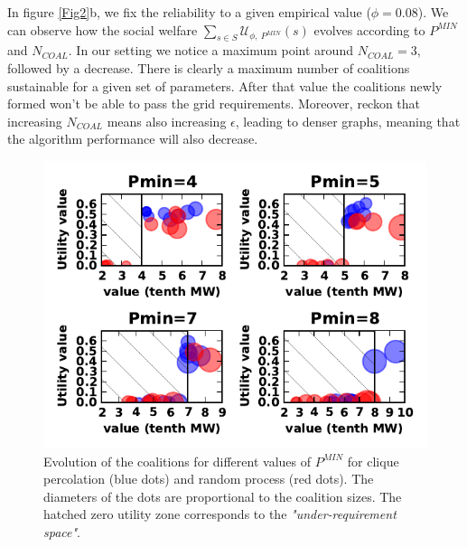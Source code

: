 \documentclass[conference]{IEEEtran}
\begin{document}
In figure \ref{Fig2}b, we fix the reliability to a given empirical value ($\phi = 0.08 $). We can observe how the social welfare $\sum_{s \in S} \mathcal{U}_{\phi,\ P^{MIN}}(s)$ evolves according to $P^{MIN}$ and $ N_{COAL} $. In our setting we notice a maximum point around $ N_{COAL} = 3 $, followed by a decrease. There is clearly a maximum number of coalitions sustainable for a given set of parameters. After that value the coalitions newly formed won't be able to pass the grid requirements. Moreover, reckon that increasing $ N_{COAL} $ means also increasing $ \epsilon $, leading to denser graphs, meaning that the algorithm performance will also decrease.

\begin{figure}[htbp]
  \centering
  \includegraphics[scale=0.65]{./figure5/coals}
  \caption{Evolution of the coalitions for different values of $ P^{MIN} $ for clique percolation (blue dots) and random process (red dots). The diameters of the dots are proportional to the coalition sizes. The hatched zero utility zone corresponds to the \textit{"under-requirement space"}.}
  \label{Fig3}
\end{figure}
\end{document}
